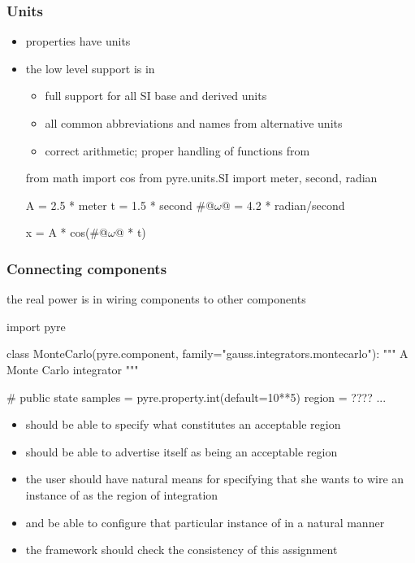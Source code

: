 \begin{frame}[fragile]
%
  \frametitle{Units}
%
  \begin{itemize}
%
  \item {} properties have units
%
  \item the low level support is in 
    \begin{itemize}
    \item full support for all SI base and derived units
    \item all common abbreviations and names from alternative units
    \item correct arithmetic; proper handling of functions from 
    \end{itemize}
%
    \begin{ipython}{}
from math import cos
from pyre.units.SI import meter, second, radian

A = 2.5 * meter
t = 1.5 * second
#@$\omega$@ = 4.2 * radian/second

x = A * cos(#@$\omega$@ * t)
    \end{ipython}
%
  \end{itemize}
%
\end{frame}

\begin{frame}[fragile]
%
  \frametitle{Connecting components}
%
  the real power is in wiring components to other components
%
  \begin{ipython}{}
import pyre

class MonteCarlo(pyre.component, family="gauss.integrators.montecarlo"):
    """
    A Monte Carlo integrator
    """

    # public state
    samples = pyre.property.int(default=10**5)
    region = ????
    ...
  \end{ipython}
%
  \begin{itemize}
  \item {} should be able to specify what constitutes an acceptable region
  \item {} should be able to advertise itself as being an acceptable
    region
  \item the user should have natural means for specifying that she wants to wire an instance of
     as the region of integration
  \item and be able to configure that particular instance of  in a natural
    manner
  \item the framework should check the consistency of this assignment
  \end{itemize}
%
\end{frame}

